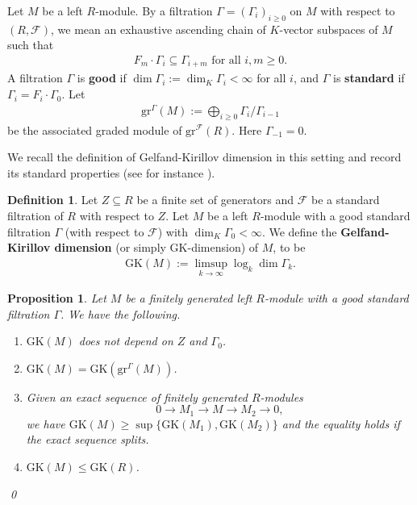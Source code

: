 \documentclass[11pt,a4paper,usenames,dvipsnames,reqno]{amsart}
\numberwithin{equation}{section}
\DeclareMathOperator{\calf}{\mathcal{F}}
\newtheorem{Prop}[Thm]{Proposition}
\theoremstyle{definition}
\newtheorem{Def}[Thm]{Definition}
\theoremstyle{remark}
\begin{document}
Let $M$ be a left $R$-module. By a filtration $\Gamma=(\Gamma_i)_{i\ge 0}$ on $M$ with respect to $(R,\mathcal{F})$, we mean an exhaustive ascending chain of $K$-vector subspaces of $M$ such that
\begin{align*}
    F_m\cdot \Gamma_i\subseteq \Gamma_{i+m} \textrm{ for all }i,m\ge 0.
\end{align*}
A filtration $\Gamma$ is \textbf{good} if $\dim\Gamma_i:=\dim_K\Gamma_i<\infty$ for all $i$, and $\Gamma$ is \textbf{standard} if $\Gamma_i=F_i\cdot \Gamma_0.$ Let
\begin{align*}
    \mathrm{gr}^{\Gamma}(M):=\bigoplus_{i\ge 0} \Gamma_i/\Gamma_{i-1}
\end{align*}
be the associated graded module of $ \mathrm{gr}^{\calf}(R)$. Here $\Gamma_{-1}=0$.

We recall the definition of Gelfand-Kirillov dimension in this setting and record its standard properties (see for instance \cite[Chapter 8]{noncomm}).

\begin{Def}
Let $Z\subseteq R$ be a finite set of generators and $\mathcal{F}$ be a standard filtration of $R$ with respect to $Z$. Let $M$ be a left $R$-module with a good standard filtration $\Gamma$ (with respect to $\mathcal{F}$) with $\dim_K\Gamma_0<\infty$. We define the \textbf{Gelfand-Kirillov dimension} (or simply GK-dimension) of $M$, to be
\begin{align*}
    \mathrm{GK}(M):=\limsup_{k\to \infty} \log_k \dim \Gamma_k.
\end{align*}
\end{Def}

\begin{Prop}\label{prop:easy}
Let $M$ be a finitely generated left $R$-module with a good standard filtration $\Gamma$. We have the following.
\begin{enumerate}
    \item $\mathrm{GK}(M)$ does not depend on $Z$ and $\Gamma_0$.
    \item $\mathrm{GK}(M)=\mathrm{GK}(\mathrm{gr}^\Gamma(M))$.
    \item Given an exact sequence of finitely generated $R$-modules
    $$0\to M_1\longrightarrow  M\longrightarrow  M_2\longrightarrow  0,$$
    we have $\mathrm{GK}(M)\ge \sup\{\mathrm{GK}(M_1),\mathrm{GK}(M_2)\}$ and the equality holds if the exact sequence splits.
    \item $\mathrm{GK}(M)\le \mathrm{GK}(R)$.
\end{enumerate}\qed
\end{Prop}
\end{document}
